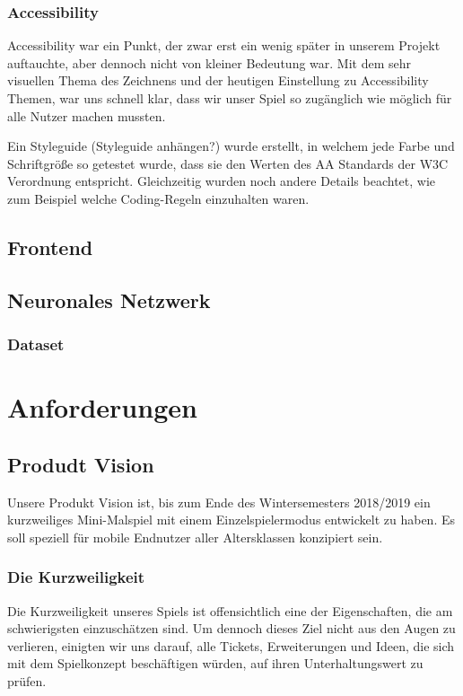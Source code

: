 \documentclass[11pt]{article}
\begin{document}
\subsubsection{Accessibility}

Accessibility war ein Punkt, der zwar erst ein wenig später in unserem Projekt auftauchte, aber dennoch nicht von kleiner Bedeutung war. Mit dem sehr visuellen Thema des Zeichnens und der heutigen Einstellung zu Accessibility Themen, war uns schnell klar, dass wir unser Spiel so zugänglich wie möglich für alle Nutzer machen mussten.

Ein Styleguide (Styleguide anhängen?) wurde erstellt, in welchem jede Farbe und Schriftgröße so getestet wurde, dass sie den Werten des AA Standards der W3C Verordnung entspricht.
Gleichzeitig wurden noch andere Details beachtet, wie zum Beispiel welche Coding-Regeln einzuhalten waren.


\subsection{Frontend}
\subsection{Neuronales Netzwerk}
\subsubsection{Dataset}
\section{Anforderungen}
\label{chap: Anforderungen}
\subsection{Produdt Vision}
Unsere Produkt Vision ist, bis zum Ende des Wintersemesters 2018/2019 ein kurzweiliges Mini-Malspiel mit einem Einzelspielermodus entwickelt zu haben. Es soll speziell für mobile Endnutzer aller Altersklassen konzipiert sein.
\subsubsection{Die Kurzweiligkeit}
Die Kurzweiligkeit unseres Spiels ist offensichtlich eine der Eigenschaften, die am schwierigsten einzuschätzen sind. Um dennoch dieses Ziel nicht aus den Augen zu verlieren, einigten wir uns darauf, alle Tickets, Erweiterungen und Ideen, die sich mit dem Spielkonzept beschäftigen würden, auf ihren Unterhaltungswert zu prüfen.
\end{document}
